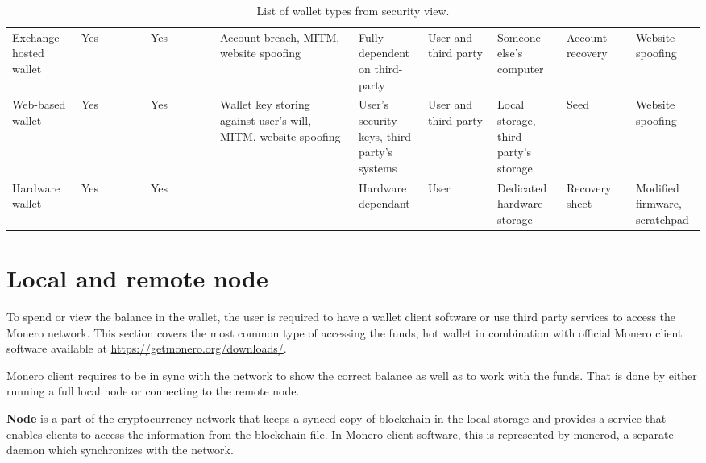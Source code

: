 \documentclass[
  printed, %
  table,   %
  nolof,     %
  nolot,     %
           oneside, color
]{fithesis3}
\begin{document}
\begin{table}
{\begin{tabular}{p{0.1\linewidth}p{0.1\linewidth}p{0.1\linewidth}p{0.2\linewidth}p{0.1\linewidth}p{0.1\linewidth}p{0.1\linewidth}p{0.1\linewidth}p{0.1\linewidth}}
Exchange hosted wallet & Yes                            & Yes               & Account breach, MITM, website spoofing                         & Fully dependent on third-party                    & User and third party & Someone else's computer             & Account recovery & Website spoofing              \\
Web-based wallet       & Yes                            & Yes               & Wallet key storing against user's will, MITM, website spoofing & User's security keys, third party's systems & User and third party & Local storage, third party's storage  & Seed             & Website spoofing              \\
Hardware wallet        & Yes                            & Yes               &                                                                & Hardware dependant                              & User               & Dedicated hardware storage          & Recovery sheet   & Modified firmware, scratchpad
\end{tabular}%
}
\caption{List of wallet types from security view.}
\label{table:wallettypes}
\end{table}\newpage



\section{Local and remote node}
To spend or view the balance in the wallet, the user is required to have a wallet client software or use third party services to access the Monero network. This section covers the most common type of accessing the funds, hot wallet in combination with official Monero client software available at \url{https://getmonero.org/downloads/}.

Monero client requires to be in sync with the network to show the correct balance as well as to work with the funds. That is done by either running a full local node or connecting to the remote node.

\textbf{Node} is a part of the cryptocurrency network that keeps a synced copy of blockchain in the local storage and provides a service that enables clients to access the information from the blockchain file. In Monero client software, this is represented by monerod, a separate daemon which synchronizes with the network.
\end{document}
